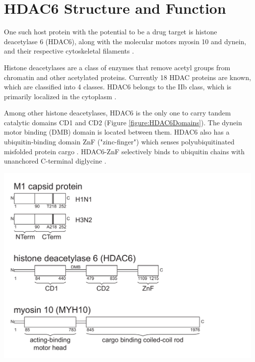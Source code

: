 \section{HDAC6 Structure and Function}

One such host protein with the potential to be a drug target is histone deacetylase 6 (HDAC6), along with the molecular motors myosin 10 and dynein, and their respective cytoskeletal filaments \cite{banerjee2014influenza}.

Histone deacetylases are a class of enzymes that remove acetyl groups from chromatin and other acetylated proteins. Currently 18 HDAC proteins are known, which are classified into 4 classes. HDAC6 belongs to the IIb class, which is primarily localized in the cytoplasm \cite{hai2016histone}.

Among other histone deacetylases, HDAC6 is the only one to carry tandem catalytic domains CD1 and CD2 (Figure \ref{figure:HDAC6Domains}). The dynein motor binding (DMB) domain is located between them. HDAC6 also has a ubiquitin-binding domain ZnF ("zinc-finger") which senses polyubiquitinated misfolded protein cargo \cite{hai2016histone}. HDAC6-ZnF selectively binds \cite{zhang2008mice} to ubiquitin chains with unanchored C-terminal diglycine \cite{ouyang2012protein}.

\begin{center}
\includegraphics[width=1\textwidth, trim={0cm 6cm 8cm 8.8cm}, clip]{D_chapters/0_introduction/protein_domains.pdf}
\label{figure:HDAC6Domains}
\end{center}

